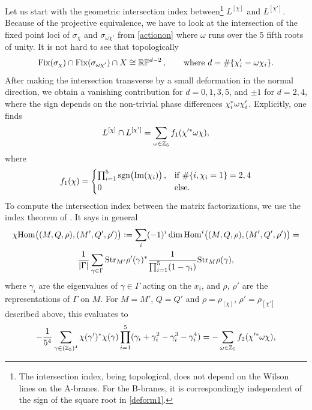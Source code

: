 Let us start with the geometric intersection index between\footnote{The 
intersection index, being topological, does not depend on the 
Wilson lines on the A-branes. For the B-branes, it is correspondingly independent of the 
sign of the square root in \eqref{deform1}.}
$L^{[\chi]}$ and
$L^{[\chi']}$. Because of the projective equivalence,
we have to look at the intersection of the fixed point loci of $\sigma_\chi$
and $\sigma_{\omega\chi'}$ from \eqref{actionon} where $\omega$ runs over the $5$ fifth 
roots of unity. It is not hard to see that topologically
\begin{equation}
{\rm Fix}(\sigma_{\chi})\cap {\rm Fix}(\sigma_{\omega\chi'})\cap X \cong 
\reals\projective^{d-2}\,, \qquad\text{where $d=\# \{\chi'_i=\om\chi_i\}$} .
\end{equation}
After making the intersection transverse by a small deformation in the normal direction,
we obtain a vanishing contribution for $d=0,1,3,5$, and $\pm 1$ for $d=2,4$, where the
sign depends on the non-trivial phase differences $\chi_i^* \om\chi'_i$. Explicitly,
one finds
\begin{equation}
\eqlabel{inter1}
L^{[\chi]}\cap L^{[\chi']} = \sum_{\om\in\zet_5} f_1(\chi'^*\om\chi) ,
\end{equation}
where
\begin{equation}
f_1(\chi) = 
\begin{cases} \prod_{i=1}^5 {\rm sgn}\bigl( \Im(\chi_i)\bigr)\,, & \text{if $\#\{i,\chi_i=1\}=2,4$} \\
0 & \text{else} .
\end{cases}
\end{equation}
To compute the intersection index between the matrix factorizations, we use the index
theorem of \cite{stability}. It says in general
\begin{multline}
\eqlabel{indextheorem}
\chi\Hom\bigl((M,Q,\rho),(M',Q',\rho')\bigr) :=
\sum_{i} (-1)^i \dim\Hom^i\bigl((M,Q,\rho),(M',Q',\rho')\bigr)=\\
\frac{1}{|\Gamma|} \sum_{\gamma\in\Gamma} \str_{M'} \rho'(\gamma)^*
\frac{1}{\prod_{i=1}^5(1-\gamma_i)}\str_M \rho(\gamma) ,
\end{multline}
where $\gamma_i$ are the eigenvalues of $\gamma\in\Gamma$ acting on the $x_i$,
and $\rho$, $\rho'$ are the representations of $\Gamma$ on $M$. For $M=M'$, $Q=Q'$ and 
$\rho=\rho_{[\chi]}$, $\rho'=\rho_{[\chi']}$ described above, this evaluates to
\begin{equation}
\eqlabel{inter2}
-\frac{1}{5^4} \sum_{\gamma\in(\zet_5)^4} \chi(\gamma')^*\chi(\gamma)
\prod_{i=1}^5 (\gamma_i+\gamma_i^2-\gamma_i^3-\gamma_i^4)
= - \sum_{\om\in\zet_5} f_2(\chi'^*\om\chi) ,
\end{equation}
